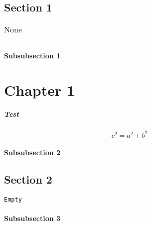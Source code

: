 

\section{Section 1}

\begin{verse}
\end{verse}

\begin{table}%
\begin{tabular}{lcr}

\end{tabular}
\caption{None}
\label{tbl:Test}
\end{table}

\subsubsection{Subsubsection 1}
\label{sec:s1}

\chapter{Chapter 1}

\paragraph{Test}

\begin{equation}
c^2=a^2+b^2
\label{eq:Pythagoras}
\end{equation}

\subsubsection{Subsubsection 2}
\label{sec:s2}

\section{Section 2}
\label{sec:s3}

\begin{verbatim}
Empty
\end{verbatim}


\subsubsection{Subsubsection 3}

